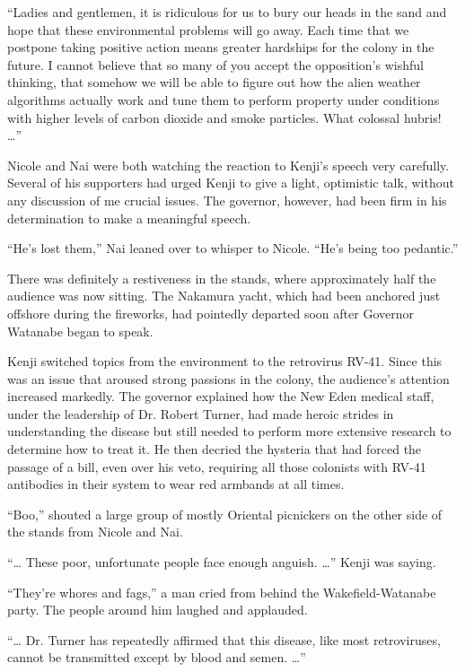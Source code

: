 \documentclass[]{article}
\begin{document}
{“Ladies and gentlemen, it is ridiculous for us to bury our heads in the sand and hope that these environmental problems will go away.  Each time that we postpone taking positive action means greater hardships for the colony in the future.  I cannot believe that so many of you accept the opposition’s wishful thinking, that somehow we will be able to figure out how the alien weather algorithms actually work and tune them to perform property under conditions with higher levels of carbon dioxide and smoke particles.  What colossal hubris! …”

Nicole and Nai were both watching the reaction to Kenji’s speech very carefully.  Several of his supporters had urged Kenji to give a light, optimistic talk, without any discussion of me crucial issues.  The governor, however, had been firm in his determination to make a meaningful speech.

“He’s lost them,” Nai leaned over to whisper to Nicole.  “He’s being too pedantic.”

There was definitely a restiveness in the stands, where approximately half the audience was now sitting.  The Nakamura yacht, which had been anchored just offshore during the fireworks, had pointedly departed soon after Governor Watanabe began to speak.

Kenji switched topics from the environment to the retrovirus RV-41.  Since this was an issue that aroused strong passions in the colony, the audience’s attention increased markedly.  The governor explained how the New Eden medical staff, under the leadership of Dr.  Robert Turner, had made heroic strides in understanding the disease but still needed to perform more extensive research to determine how to treat it.  He then decried the hysteria that had forced the passage of a bill, even over his veto, requiring all those colonists with RV-41 antibodies in their system to wear red armbands at all times.

“Boo,” shouted a large group of mostly Oriental picnickers on the other side of the stands from Nicole and Nai.

“… These poor, unfortunate people face enough anguish.  …” Kenji was saying.

“They’re whores and fags,” a man cried from behind the Wakefield-Watanabe party.  The people around him laughed and applauded.

“… Dr.  Turner has repeatedly affirmed that this disease, like most retroviruses, cannot be transmitted except by blood and semen.  …”

}
\end{document}
